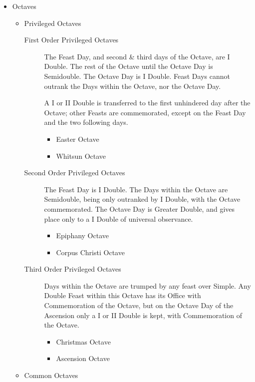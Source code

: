 \begin{itemize}
    \item Octaves
        \begin{itemize}
            \item Privileged Octaves
                \begin{description}
                    \item[First Order Privileged Octaves] The Feast Day, and second \& third days of the Octave, are I Double. The rest of the Octave until the Octave Day is Semidouble. The Octave Day is I Double. Feast Days cannot outrank the Days within the Octave, nor the Octave Day.\par
                    A I or II Double is transferred to the first unhindered day after the Octave; other Feasts are commemorated, except on the Feast Day and the two following days.
                        \begin{itemize}
                            \item Easter Octave
                            \item Whitsun Octave
                        \end{itemize}
                    \item[Second Order Privileged Octaves] The Feast Day is I Double. The Days within the Octave are Semidouble, being only outranked by I Double, with the Octave commemorated. The Octave Day is Greater Double, and gives place only to a I Double of universal observance.
                        \begin{itemize}
                            \item Epiphany Octave
                            \item Corpus Christi Octave
                        \end{itemize}
                    \item[Third Order Privileged Octaves] Days within the Octave are trumped by any feast over Simple. Any Double Feast within this Octave has its Office with Commemoration of the Octave, but on the Octave Day of the Ascension only a I or II Double is kept, with Commemoration of the Octave.
                        \begin{itemize}
                            \item Christmas Octave
                            \item Ascension Octave
                        \end{itemize}
                \end{description}
            \item Common Octaves\par

\end{itemize}
\end{itemize}
